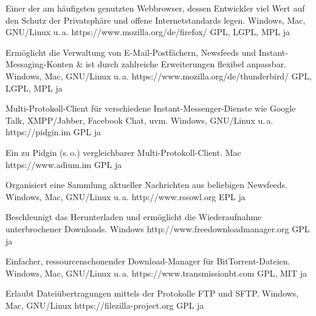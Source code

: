




{Einer der am häufigsten genutzten Webbrowser, dessen Entwickler viel Wert auf den Schutz der Privatsphäre und offene Internetstandards legen.}
{Windows, Mac, GNU/Linux u.\,a.}
{https://www.mozilla.org/de/firefox/}
{GPL, LGPL, MPL}
{ja}

{Ermöglicht die Verwaltung von E-Mail-Postfächern, Newsfeeds und Instant-Messaging-Konten \& ist durch zahlreiche Erweiterungen flexibel anpassbar.}
{Windows, Mac, GNU/Linux u.\,a.}
{https://www.mozilla.org/de/thunderbird/}
{GPL, LGPL, MPL}
{ja}

{Multi-Protokoll-Client für verschiedene Instant-Messenger-Dienste wie \mbox{Google} Talk, XMPP/Jabber, Facebook Chat, uvm.}
{Windows, GNU/Linux u.\,a.}
{https://pidgin.im}
{GPL}
{ja}

{Ein zu Pidgin (s.\,o.) vergleichbarer Multi-Protokoll-Client.}
{Mac}
{https://www.adium.im}
{GPL}
{ja}

{Organisiert eine Sammlung aktueller Nachrichten aus beliebigen Newsfeeds.}
{Windows, Mac, GNU/Linux u.\,a.}
{http://www.rssowl.org}
{EPL}
{ja}

{Beschleunigt das Herunterladen und ermöglicht die Wiederaufnahme unterbrochener Downloads.}
{Windows}
{http://www.freedownloadmanager.org}
{GPL}
{ja}

{Einfacher, ressourcenschonender Download-Manager für BitTorrent-Dateien.}
{Windows, Mac, GNU/Linux u.\,a.}
{https://www.transmissionbt.com}
{GPL, MIT}
{ja}

{Erlaubt Dateiübertragungen mittels der Protokolle FTP und SFTP.}
{Windows, Mac, GNU/Linux}
{https://filezilla-project.org}
{GPL}
{ja}

\backpage


